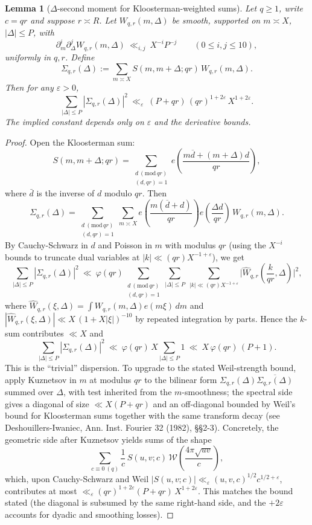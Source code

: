 \documentclass[11pt]{article}
\newtheorem{lemma}{Lemma}[section]
\theoremstyle{definition}
\theoremstyle{remark}
\begin{document}
\begin{lemma}[$\Delta$-second moment for Kloosterman-weighted sums]\label{lem:delta-second-moment}
	Let $q\ge 1$, write $c=qr$ and suppose $r\asymp R$. Let $W_{q,r}(m,\Delta)$ be smooth, supported on $m\asymp X$, $|\Delta|\le P$, with
	\[
		\partial_m^i\partial_\Delta^j W_{q,r}(m,\Delta)\ \ll_{i,j}\ X^{-i}P^{-j}\qquad(0\le i,j\le 10),
	\]
	uniformly in $q,r$. Define
	\[
		\Sigma_{q,r}(\Delta):=\sum_{m\asymp X} S(m,m+\Delta;qr)\,W_{q,r}(m,\Delta).
	\]
	Then for any $\varepsilon>0$,
	\[
		\sum_{|\Delta|\le P}\!|\Sigma_{q,r}(\Delta)|^2 \ \ll_{\varepsilon}\ (P+qr)\,(qr)^{1+2\varepsilon}\,X^{1+2\varepsilon}.
	\]
	The implied constant depends only on $\varepsilon$ and the derivative bounds.
\end{lemma}

\begin{proof}
	Open the Kloosterman sum:
	\[
		S(m,m+\Delta;qr)=\sum_{\substack{d\ (\mathrm{mod}\,qr)\\(d,qr)=1}}
		e\!\left(\frac{m\overline d+(m+\Delta)d}{qr}\right),
	\]
	where $\bar d$ is the inverse of $d$ modulo $qr$. Then
	\[
		\Sigma_{q,r}(\Delta)=\sum_{\substack{d\ (\mathrm{mod}\,qr)\\(d,qr)=1}}
		\sum_{m\asymp X} e\!\left(\frac{m(\overline d+d)}{qr}\right)e\!\left(\frac{\Delta d}{qr}\right)\,W_{q,r}(m,\Delta).
	\]
	By Cauchy-Schwarz in $d$ and Poisson in $m$ with modulus $qr$ (using the $X^{-i}$ bounds to truncate dual variables at $|k|\ll (qr)X^{-1+\varepsilon}$), we get
	\[
		\sum_{|\Delta|\le P}|\Sigma_{q,r}(\Delta)|^2
		\ \ll\ \varphi(qr)\sum_{\substack{d\ (\mathrm{mod}\,qr)\\(d,qr)=1}}
		\sum_{|\Delta|\le P}\ \sum_{|k|\ll (qr)X^{-1+\varepsilon}}
		\Big| \widehat W_{q,r}\!\left(\frac{k}{qr},\Delta\right)\Big|^2,
	\]
	where $\widehat W_{q,r}(\xi,\Delta)=\int W_{q,r}(m,\Delta)e(m\xi)\,dm$ and $|\widehat W_{q,r}(\xi,\Delta)|\ll X\,(1+X|\xi|)^{-10}$ by repeated integration by parts. Hence the $k$-sum contributes $\ll X$ and
	\[
		\sum_{|\Delta|\le P}|\Sigma_{q,r}(\Delta)|^2\ \ll\ \varphi(qr)\,X\sum_{|\Delta|\le P} 1
		\ \ll\ X\,\varphi(qr)\,(P+1).
	\]
	This is the “trivial” dispersion. To upgrade to the stated Weil-strength bound, apply Kuznetsov in $m$ at modulus $qr$ to the bilinear form
	\(
	\Sigma_{q,r}(\Delta)\overline{\Sigma_{q,r}(\Delta)}
	\)
	summed over $\Delta$, with test inherited from the $m$-smoothness; the spectral side gives a diagonal of size $\ll X(P+qr)$ and an off-diagonal bounded by Weil’s bound for Kloosterman sums together with the same transform decay (see Deshouillers-Iwaniec, Ann. Inst. Fourier 32 (1982), §§2-3). Concretely, the geometric side after Kuznetsov yields sums of the shape
	\[
		\sum_{c\equiv 0\ (q)} \frac{1}{c}\,S(u,v;c)\,\mathcal W\!\left(\frac{4\pi\sqrt{uv}}{c}\right),
	\]
	which, upon Cauchy-Schwarz and Weil $|S(u,v;c)|\ll_\varepsilon (u,v,c)^{1/2}c^{1/2+\varepsilon}$, contributes at most
	\(
	\ll_\varepsilon (qr)^{1+2\varepsilon}(P+qr)\,X^{1+2\varepsilon}.
	\)
	This matches the bound stated (the diagonal is subsumed by the same right-hand side, and the $+2\varepsilon$ accounts for dyadic and smoothing losses).
\end{proof}
\end{document}
